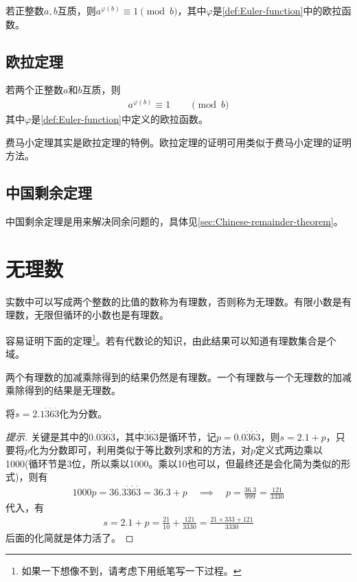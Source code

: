 \begin{corollary}
  若正整数$a,b$互质，则$a^{\varphi(b)}\equiv1\pmod b$，其中$\varphi$是\ref{def:Euler-function}中的欧拉函数。
\end{corollary}

\subsection{欧拉定理}
\label{sec:euler-theorem}
\begin{theorem}
  若两个正整数$a$和$b$互质，则
  \begin{align*}
    a^{\varphi(b)}\equiv1\quad\quad\pmod{b}
  \end{align*}
  其中$\varphi$是\ref{def:Euler-function}中定义的欧拉函数。
\end{theorem}

费马小定理其实是欧拉定理的特例。欧拉定理的证明可用类似于费马小定理的证明方法。

\subsection{中国剩余定理}
\label{sec:china-remainder-theorem}
中国剩余定理是用来解决同余问题的，具体见\ref{sec:Chinese-remainder-theorem}。

\section{无理数}
\label{sec:irrational-numbers}

实数中可以写成两个整数的比值的数称为有理数，否则称为无理数。有限小数是有理数，无限但循环的小数也是有理数。

容易证明下面的定理\footnote{如果一下想像不到，请考虑下用纸笔写一下过程。}。若有代数论的知识，由此结果可以知道有理数集合是个域。

\begin{theorem}\label{th:rational-number-field}
  两个有理数的加减乘除得到的结果仍然是有理数。一个有理数与一个无理数的加减乘除得到的结果是无理数。
\end{theorem}

\begin{example}
  将$s=2.1\dot3\dot6\dot3$化为分数。
\end{example}
\begin{proof}[提示]
  关键是其中的$0.0\dot3\dot6\dot3$，其中$\dot3\dot6\dot3$是循环节，记$p=0.0\dot3\dot6\dot3$，则$s=2.1+p$，只要将$p$化为分数即可，利用类似于等比数列求和的方法，对$p$定义式两边乘以1000(循环节是3位，所以乘以1000。乘以10也可以，但最终还是会化简为类似的形式)，则有
  \begin{align*}
    1000p = 36.3\dot3\dot6\dot3 = 36.3 + p \quad\implies\quad p=\frac{36.3}{999}=\frac{121}{3330}
  \end{align*}
  代入，有
  \begin{align*}
    s=2.1+p = \frac{21}{10} + \frac{121}{3330} = \frac{21\times333 + 121}{3330}
  \end{align*}
  后面的化简就是体力活了。
\end{proof}



